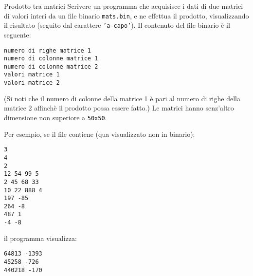 \begin{labex}{Prodotto tra matrici}
Scrivere un programma che acquisisce i dati di due matrici di valori interi da un file binario \texttt{mats.bin}, e ne effettua il prodotto, visualizzando il risultato (seguito dal carattere \texttt{'a-capo'}).
Il contenuto del file binario \`e il seguente:
\begin{verbatim}
numero di righe matrice 1
numero di colonne matrice 1 
numero di colonne matrice 2
valori matrice 1
valori matrice 2
\end{verbatim}

(Si noti che il numero di colonne della matrice 1 \`e pari al numero di righe della matrice 2 affinch\`e il prodotto possa essere fatto.)
Le matrici hanno senz'altro dimensione non superiore a \texttt{50x50}.

Per esempio, se il file contiene (qua visualizzato non in binario):
\begin{verbatim}
3
4
2
12 54 99 5
2 45 68 33
10 22 888 4
197 -85
264 -8 
487 1
-4 -8
\end{verbatim}
il programma visualizza:
\begin{verbatim}
64813 -1393 
45258 -726 
440218 -170 
\end{verbatim}

\begin{labexinout}
\end{labexinout}


\end{labex}


